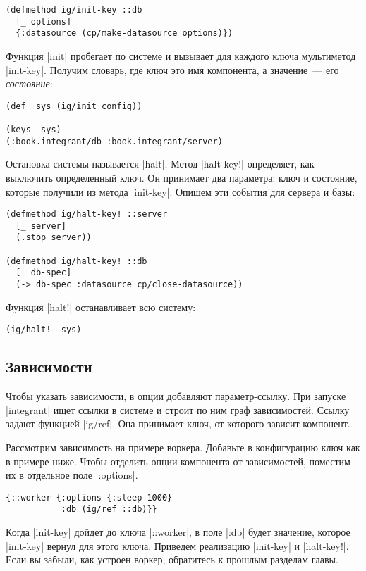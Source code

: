 \begin{verbatim}
(defmethod ig/init-key ::db
  [_ options]
  {:datasource (cp/make-datasource options)})
\end{verbatim}

Функция \spverb|init| пробегает по системе и вызывает для каждого ключа
мультиметод \spverb|init-key|. Получим словарь, где ключ это имя компонента, а
значение~--- его \emph{состояние}:

\begin{verbatim}
(def _sys (ig/init config))

(keys _sys)
(:book.integrant/db :book.integrant/server)
\end{verbatim}

Остановка системы называется \spverb|halt|. Метод \spverb|halt-key!| определяет,
как выключить определенный ключ. Он принимает два параметра: ключ и состояние,
которые получили из метода \spverb|init-key|. Опишем эти события для сервера и
базы:

\begin{verbatim}
(defmethod ig/halt-key! ::server
  [_ server]
  (.stop server))

(defmethod ig/halt-key! ::db
  [_ db-spec]
  (-> db-spec :datasource cp/close-datasource))
\end{verbatim}

Функция \spverb|halt!| останавливает всю систему:

\begin{verbatim}
(ig/halt! _sys)
\end{verbatim}

\subsection{Зависимости}

Чтобы указать зависимости, в опции добавляют параметр-ссылку. При запуске
\spverb|integrant| ищет ссылки в системе и строит по ним граф
зависимостей. Ссылку задают функцией \spverb|ig/ref|. Она принимает ключ, от
которого зависит компонент.

Рассмотрим зависимость на примере воркера. Добавьте в конфигурацию ключ как в
примере ниже. Чтобы отделить опции компонента от зависимостей, поместим их в
отдельное поле \spverb|:options|.

\begin{verbatim}
{::worker {:options {:sleep 1000}
           :db (ig/ref ::db)}}
\end{verbatim}

Когда \spverb|init-key| дойдет до ключа \spverb|::worker|, в поле \spverb|:db|
будет значение, которое \spverb|init-key| вернул для этого ключа. Приведем
реализацию \spverb|init-key| и \spverb|halt-key!|. Если вы забыли, как устроен
воркер, обратитесь к прошлым разделам главы.

